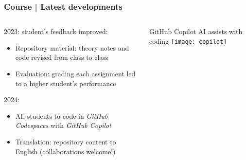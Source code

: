 \documentclass[aspectratio=169]{beamer}
\begin{document}
\begin{frame}
	\frametitle{Course | Latest developments}
\begin{columns}[b]
   \begin{column}{0.47\textwidth}
			\begin{block}{}
				2023: student's feedback improved:
				\begin{itemize}
					\item Repository material: theory notes and code revised from class to class
					\item Evaluation: grading each assignment led to a higher student's performance
				\end{itemize}
				2024:
				\begin{itemize}
					\item AI: students to code in \emph{GitHub Codespaces} with \emph{GitHub Copilot}
					\item Translation: repository content to English (collaborations welcome!)
				\end{itemize}
			\end{block}
    \end{column}
    \begin{column}{0.48\textwidth}
			\begin{block}{GitHub Copilot AI assists with coding}
				\texttt{[image: copilot]}
			\end{block}
    \end{column}
	\end{columns}
\end{frame}


\end{document}

